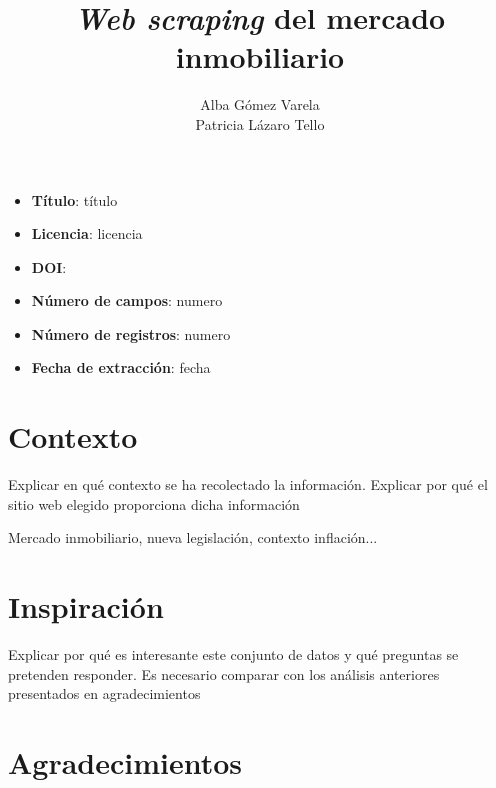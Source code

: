 \documentclass[12pt]{article}
\title{\textit{Web scraping} del mercado inmobiliario}
\author{Alba Gómez Varela\\Patricia Lázaro Tello}
\date{}	%
\begin{document}

\maketitle
\thispagestyle{uoc}

\vspace{-2em}
\begin{framed}
	\begin{multicols}{2}
		\begin{itemize}[topsep=0cm,partopsep=0cm,label={},wide]
			\item \textbf{Título}: título
			\item \textbf{Licencia}: licencia
			\item \textbf{DOI}:
			\columnbreak
			\item \textbf{Número de campos}: numero
			\item \textbf{Número de registros}: numero
			\item \textbf{Fecha de extracción}: fecha
		\end{itemize}
	\end{multicols}
\end{framed}

\vspace{-2em}

\section*{Contexto}\vspace{-1.5em}

Explicar en qué contexto se ha recolectado la información. Explicar
por qué el sitio web elegido proporciona dicha información

Mercado inmobiliario, nueva legislación, contexto inflación...

\vspace{-1.5em}\section*{Inspiración}\vspace{-1.5em}

Explicar por qué es interesante este conjunto de datos y qué
preguntas se pretenden responder. Es necesario comparar con los análisis
anteriores presentados en agradecimientos

\vspace{-1.5em}\section*{Agradecimientos}\vspace{-1.5em}
\end{document}

